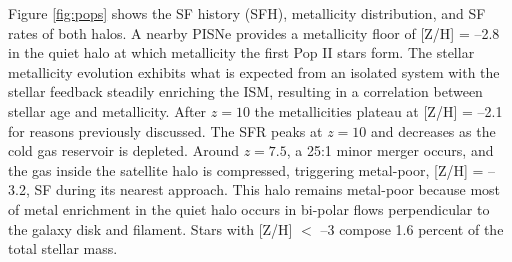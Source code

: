 \documentclass[apjl]{emulateapj}
\begin{document}



\begin{figure*}
\caption{\label{fig:pops} The scatter plots show the SF history of the
  quiet (left) and intense (right) halos as a function of metallicity
  at $z=7$.  Each circle represents a star cluster, whose area is
  proportional to its mass.  The open circles in the upper right
  represent $10^3$, $10^4$, and $10^5$ \Ms~star clusters.  The dashed
  lines in the right panel guide the eye to two stellar populations
  that were formed in two satellite halos, merging at $z=7.5$.  The
  upper histogram shows the SFR.  The right histogram depicts the
  stellar metallicity distribution.}
\end{figure*}


Figure \ref{fig:pops} shows the SF history (SFH), metallicity
distribution, and SF rates of both halos.  A nearby PISNe provides a
metallicity floor of [Z/H] = --2.8 in the quiet halo at which
metallicity the first Pop II stars form.  The stellar metallicity
evolution exhibits what is expected from an isolated system with the
stellar feedback steadily enriching the ISM, resulting in a
correlation between stellar age and metallicity.  After $z=10$ the
metallicities plateau at [Z/H] = --2.1 for reasons previously
discussed.  The SFR peaks at $z=10$ and decreases as the cold gas
reservoir is depleted.  Around $z=7.5$, a 25:1 minor merger occurs,
and the gas inside the satellite halo is compressed, triggering
metal-poor, [Z/H] = --3.2, SF during its nearest approach.  This halo
remains metal-poor because most of metal enrichment in the quiet halo
occurs in bi-polar flows perpendicular to the galaxy disk and
filament.  Stars with [Z/H] $<$ --3 compose 1.6 percent of the total
stellar mass.
       
\end{document}
